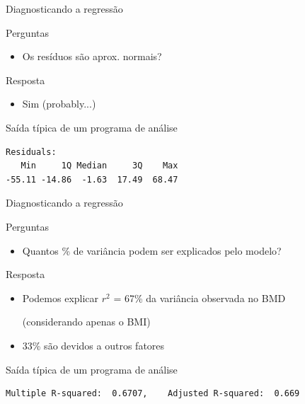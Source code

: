 \documentclass{beamer}
\begin{document}
\begin{frame}[fragile]{Diagnosticando a regressão}
  \begin{block}{Perguntas}
    \begin{itemize}
      \footnotesize
    \item Os resíduos são aprox. normais?
    \end{itemize}
  \end{block}
  \bigskip
  \begin{exampleblock}{Resposta}
    \begin{itemize}
    \item Sim \hfill \footnotesize (probably...)
    \end{itemize}
  \end{exampleblock}
  \vfill
  \begin{exampleblock}{Saída típica de um programa de análise}
    \scriptsize
\begin{verbatim}
Residuals:
   Min     1Q Median     3Q    Max
-55.11 -14.86  -1.63  17.49  68.47
\end{verbatim}
\end{exampleblock}
\end{frame}

\begin{frame}[fragile]{Diagnosticando a regressão}
  \begin{block}{Perguntas}
    \begin{itemize}
      \footnotesize
    \item Quantos \% de variância podem ser explicados pelo modelo?
    \end{itemize}
  \end{block}
  \bigskip
  \begin{exampleblock}{Resposta}
    \begin{itemize}
      \footnotesize 
    \item Podemos explicar $r^2$ = 67\% da variância observada no BMD

      \scriptsize(considerando \alert{apenas} o BMI)
      \bigskip
    \item \scriptsize 33\% são devidos a outros fatores
    \end{itemize}
  \end{exampleblock}
  \vfill
  \begin{exampleblock}{Saída típica de um programa de análise}
    \scriptsize
\begin{verbatim}
Multiple R-squared:  0.6707,	Adjusted R-squared:  0.669
\end{verbatim}
\end{exampleblock}
\end{frame}
\end{document}

